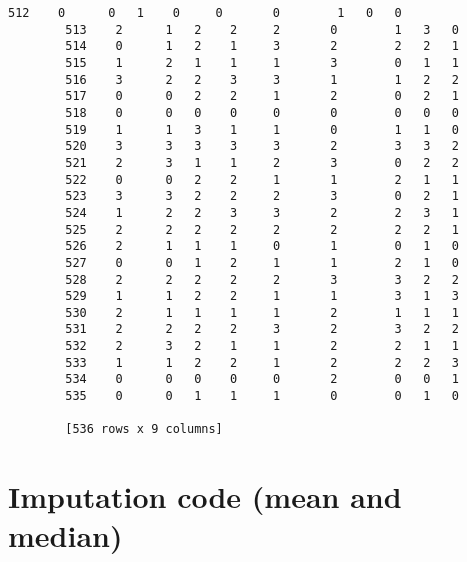 \documentclass[11pt]{article}
\begin{document}
\begin{Verbatim}[commandchars=\\\{\}]
        512    0      0   1    0     0       0        1   0   0
        513    2      1   2    2     2       0        1   3   0
        514    0      1   2    1     3       2        2   2   1
        515    1      2   1    1     1       3        0   1   1
        516    3      2   2    3     3       1        1   2   2
        517    0      0   2    2     1       2        0   2   1
        518    0      0   0    0     0       0        0   0   0
        519    1      1   3    1     1       0        1   1   0
        520    3      3   3    3     3       2        3   3   2
        521    2      3   1    1     2       3        0   2   2
        522    0      0   2    2     1       1        2   1   1
        523    3      3   2    2     2       3        0   2   1
        524    1      2   2    3     3       2        2   3   1
        525    2      2   2    2     2       2        2   2   1
        526    2      1   1    1     0       1        0   1   0
        527    0      0   1    2     1       1        2   1   0
        528    2      2   2    2     2       3        3   2   2
        529    1      1   2    2     1       1        3   1   3
        530    2      1   1    1     1       2        1   1   1
        531    2      2   2    2     3       2        3   2   2
        532    2      3   2    1     1       2        2   1   1
        533    1      1   2    2     1       2        2   2   3
        534    0      0   0    0     0       2        0   0   1
        535    0      0   1    1     1       0        0   1   0
        
        [536 rows x 9 columns]
\end{Verbatim}
            
    \hypertarget{imputation-code-mean-and-median}{%
\section{Imputation code (mean and
median)}\label{imputation-code-mean-and-median}}
\end{document}
